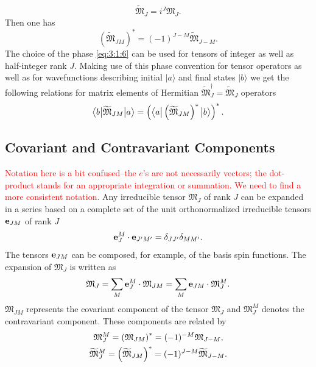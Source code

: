 \begin{equation}
\widetilde{\mathfrak{M}}_{J}=i^{J} \mathfrak{M}_{J} . \label{eq:3:1:5}
\end{equation}
Then one has
\begin{equation}
\left(\widetilde{\mathfrak{M}}_{J M}\right)^{*}=(-1)^{J-M} \widetilde{\mathfrak{M}}_{J-M} . \label{eq:3:1:6}
\end{equation}
The choice of the phase \eqref{eq:3:1:6} can be used for tensors of integer as well as half-integer rank $J$. Making use of this phase convention for tensor operators as well as for wavefunctions describing initial $|a\rangle$ and final states $|b\rangle$ we get the following relations for matrix elements of Hermitian $\widetilde{\mathfrak{M}}_{J}^{\dagger}=\widetilde{\mathfrak{M}}_{J}$ operators
\begin{equation}
\bigl\langle b \big| \widetilde{\mathfrak{M}}_{J M} \big| a \bigr\rangle=\left(\bigl\langle a \big| \left(\widetilde{\mathfrak{M}}_{J M}\right)^{*} \big| b \bigr\rangle\right)^{*} . \label{eq:3:1:7}
\end{equation}
\subsection{Covariant and Contravariant Components}\label{sec:3.1.2}
\textcolor{red}{Notation here is a bit confused--the $e$'s are not necessarily vectors; the dot-product stands for an appropriate integration or summation. We need to find a more consistent notation.}
Any irreducible tensor $\mathfrak{M}_{J}$ of rank $J$ can be expanded in a series based on a complete set of the unit orthonormalized irreducible tensors $\mathbf{e}_{J M}$ of rank $J$
\begin{equation}
\mathbf{e}_{J}^{M} \cdot \mathbf{e}_{J^{\prime} M^{\prime}}=\delta_{J J^{\prime}} \delta_{M M^{\prime}}. \label{eq:3:1:8}
\end{equation}
The tensors $\mathbf{e}_{J M}$ can be composed, for example, of the basis spin functions. The expansion of $\mathfrak{M}_{J}$ is written as
\begin{equation}
\mathfrak{M}_{J}=\sum_{M} \mathbf{e}_{J}^{M} \cdot \mathfrak{M}_{J M}=\sum_{M} \mathbf{e}_{J M} \cdot \mathfrak{M}_{J}^{M} . \label{eq:3:1:9}
\end{equation}
$\mathfrak{M}_{J M}$ represents the covariant component of the tensor $\mathfrak{M}_{J}$ and $\mathfrak{M}_{J}^{M}$ denotes the contravariant component. These components are related by
\begin{gather}
\mathfrak{M}_{J}^{M}=\left(\mathfrak{M}_{J M}\right)^{*}=(-1)^{-M} \mathfrak{M}_{J-M},  \notag\\
\widetilde{\mathfrak{M}}_{J}^{M}=\left(\widetilde{\mathfrak{M}}_{J M}\right)^{*}=(-1)^{J-M} \widetilde{\mathfrak{M}}_{J-M} . \label{eq:3:1:10}
\end{gather}
